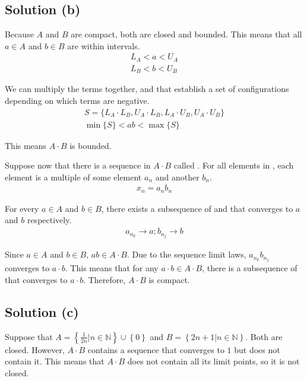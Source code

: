 \documentclass[12pt]{report}
\begin{document}
    \subsection{Solution (b)}
        Because $A$ and $B$ are compact, both are closed and bounded.
        This means that all $a \in A$ and $b \in B$ are within intervals.
        \begin{gather}
            L_A < a < U_A\\
            L_B < b < U_B
        \end{gather}

        We can multiply the terms together, and that establish a set of configurations depending on which terms are negative.
        \begin{gather}
            S = \{L_A \cdot L_B, U_A \cdot L_B, L_A \cdot U_B, U_A \cdot U_B\}\\
            \min\{S\} < ab < \max\{S\}
        \end{gather}
    
        This means $A \cdot B$ is bounded.

        Suppose now that there is a sequence in $A \cdot B$ called .
        For all elements in , each element is a multiple of some element $a_n$ and another $b_n$.
        \begin{gather}
            x_n = a_n b_n
        \end{gather}

        For every $a \in A$ and $b \in B$, there exists a subsequence of  and  that converges to $a$ and $b$ respectively.
        \begin{gather}
            a_{n_k} \to a;
            b_{n_j} \to b
        \end{gather}

        Since $a \in A$ and $b \in B$, $ab \in A \cdot B$.
        Due to the sequence limit laws, $a_{n_k}b_{n_j}$ converges to $a \cdot b$.
        This means that for any $a \cdot b \in A \cdot B$, there is a subsequence  of  that converges to $a \cdot b$.
        Therefore, $A \cdot B$ is compact.

    \subsection{Solution (c)}
        Suppose that $A = \left\{ \frac{1}{2n} \Big| n \in \mathbb{N} \right\} \cup \left\{ 0 \right\}$ and $B = \left\{ 2n + 1 \Big| n \in \mathbb{N} \right\}$.
        Both are closed.
        However, $A \cdot B$ contains a sequence that converges to $1$ but does not contain it.
        This means that $A \cdot B$ does not contain all its limit points, so it is not closed.
\pagebreak
\end{document}
